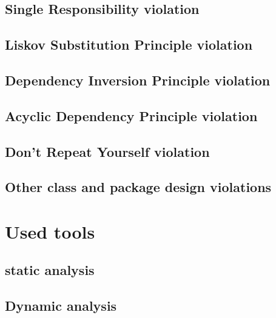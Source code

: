\documentclass[a4paper, 10pt]{article}
\begin{document}
\subsection{Single Responsibility violation}
\label{sec:srp_violation}


\subsection{Liskov Substitution Principle violation}
\label{sec:lsp_violation} %



\subsection{Dependency Inversion Principle violation}
\label{sec:dip_violation}


\subsection{Acyclic Dependency Principle violation}
\label{sec:adp_violation}


\subsection{Don't Repeat Yourself violation}
\label{sec:dry_violation}


\subsection{Other class and package design violations}
\label{sec:other_violations}

\newpage
\section{Used tools}
\label{sec:used_tools}


\subsection{static analysis}
\label{sec:static_analysis}


\subsection{Dynamic analysis}
\label{sec:dynamic_analysis}
\end{document}
